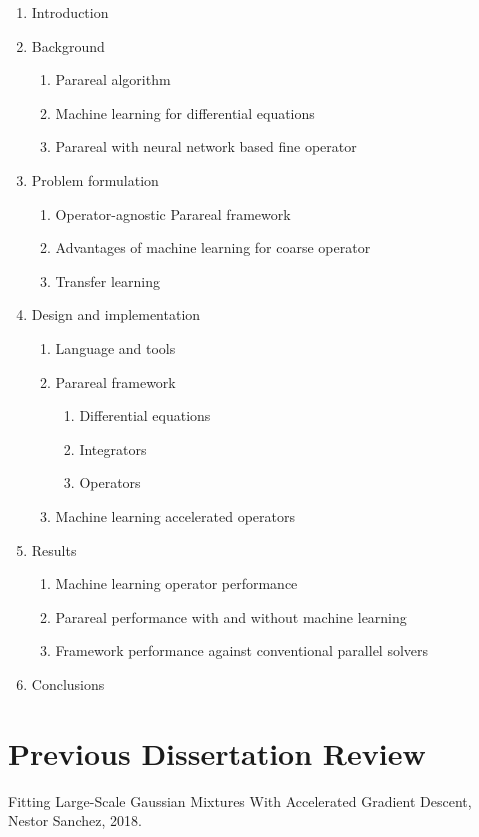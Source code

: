 \documentclass{article}
\begin{document}
\begin{enumerate}
	\item Introduction
	\item Background
    	\begin{enumerate}
    		\item Parareal algorithm
    		\item Machine learning for differential equations
    		\item Parareal with neural network based fine operator
    	\end{enumerate}
	\item Problem formulation
    	\begin{enumerate}
    		\item Operator-agnostic Parareal framework
    		\item Advantages of machine learning for coarse operator
    		\item Transfer learning
    	\end{enumerate}
	\item Design and implementation
    	\begin{enumerate}
    	    \item Language and tools
    		\item Parareal framework
            	\begin{enumerate}
            		\item Differential equations
            		\item Integrators
            		\item Operators
            	\end{enumerate}
    		\item Machine learning accelerated operators
    	\end{enumerate}
    \item Results
        \begin{enumerate}
    		\item Machine learning operator performance
    		\item Parareal performance with and without machine learning
    		\item Framework performance against conventional parallel solvers
    	\end{enumerate}
	\item Conclusions
\end{enumerate}

\section{Previous Dissertation Review}

Fitting Large-Scale Gaussian Mixtures With Accelerated Gradient Descent, Nestor Sanchez, 2018.

\pagebreak



\end{document}
